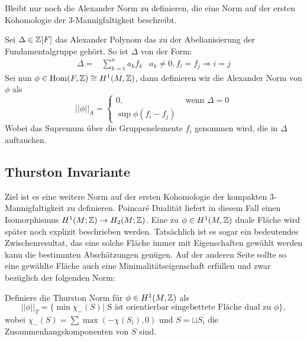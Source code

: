     	Bleibt nur noch die Alexander Norm zu definieren, die eine Norm auf der ersten Kohomologie der 3-Mannigfaltigkeit beschreibt.
    	\begin{defn}
    		Sei  $\Delta \in \mathbb{Z} [F]$ das Alexander Polynom das zu der Abelianisierung der Fundamentalgruppe gehört. So ist $\Delta$ von der Form:
    		\begin{align*}
    		    			\Delta = &\sum_{k=1}^n a_k f_k& a_k \neq 0, f_i = f_j \Rightarrow i=j
    		\end{align*}
    		Sei nun $\phi \in \operatorname{Hom} (F,\mathbb{Z}) \cong H^1 (M,\mathbb{Z})$, dann definieren wir die Alexander Norm von $\phi$ als
    		\[
    			||\phi||_A = \begin{cases}
    				0 , &\text{ wenn } \Delta=0\\
    				\sup \phi (f_i - f_j) &
    			\end{cases}
    		\]
    		Wobei das Supremum über die Gruppenelemente $f_i$ genommen wird, die in $\Delta$ auftauchen.

    	\end{defn}

    \subsection{Thurston Invariante}
        Ziel ist es eine weitere Norm auf der ersten Kohomologie der kompakten 3-Mannigfaltigkeit zu definieren. Poincaré Dualität liefert in diesem Fall einen Isomorphismus $H^1(M;\mathbb{Z}) \to H_2(M;\mathbb{Z})$. Eine zu $\phi \in H^1(M,\mathbb{Z})$ duale Fläche wird später noch explizit beschrieben werden. Tatsächlich ist es sogar ein bedeutendes Zwischenresultat, das eine solche Fläche immer mit Eigenschaften gewählt werden kann die bestimmten Abschätzungen genügen. Auf der anderen Seite sollte so eine gewählte Fläche auch eine Minimalitätseigenschaft erfüllen und zwar bezüglich der folgenden Norm:
        \begin{defn}
        	Definiere die Thurston Norm für $\phi \in H^1(M,\mathbb{Z})$ als
        	\[
        	        		||\phi||_T = \{\min \chi_-(S)| \text{ S ist orientierbar eingebettete Fläche dual zu } \phi \},
        	        	\]        	
        	wobei $\chi_-(S)=\sum \max (-\chi(S_i),0)$  und $S=\sqcup S_i$ die Zusammenhangskomponenten von $S$ sind.
        \end{defn}


